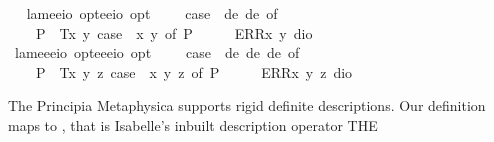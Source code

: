 \begin{isabellebody}
\isanewline
\ \isamarkupfalse%
\ lam{}{\isacharcolon}{\isacharcolon}{\isachardoublequoteopen}{\isacharparenleft}e{\isasymRightarrow}e{\isasymRightarrow}io\ opt{\isacharparenright}{\isasymRightarrow}{\isacharparenleft}e{\isasymRightarrow}e{\isasymRightarrow}io{\isacharparenright}\ opt{\isachardoublequoteclose}\ {\isacharparenleft}{\isachardoublequoteopen}\isactrlbold {\isasymlambda}\ \ {\isachardoublequoteopen}\isactrlbold {\isasymlambda}\ {\isasymequiv}\ case\ {\isacharparenleft}{\isasymPhi}\ de\ de{\isacharparenright}\ of\isanewline
\ \ \ \ P{\isacharparenleft}{\isasymphi}{\isacharparenright}\ {\isasymRightarrow}\ T{\isacharparenleft}{\isasymlambda}x\ y{\isachardot}\ case\ {\isacharparenleft}{\isasymPhi}\ x\ y{\isacharparenright}\ of\ P{\isacharparenleft}{\isasymphi}{\isacharparenright}\ {\isasymRightarrow}\ {\isasymphi}{\isacharparenright}\ {\isacharbar}\ {\isacharunderscore}\ {\isasymRightarrow}\ ERR{\isacharparenleft}{\isasymlambda}x\ y{\isachardot}\ dio{\isacharparenright}{\isachardoublequoteclose}\isanewline
\isanewline
\ \isamarkupfalse%
\ lam{}{\isacharcolon}{\isacharcolon}{\isachardoublequoteopen}{\isacharparenleft}e{\isasymRightarrow}e{\isasymRightarrow}e{\isasymRightarrow}io\ opt{\isacharparenright}{\isasymRightarrow}{\isacharparenleft}e{\isasymRightarrow}e{\isasymRightarrow}e{\isasymRightarrow}io{\isacharparenright}\ opt{\isachardoublequoteclose}\ {\isacharparenleft}{\isachardoublequoteopen}\isactrlbold {\isasymlambda}\ \ {\isachardoublequoteopen}\isactrlbold {\isasymlambda}\ {\isasymequiv}\ case\ {\isacharparenleft}{\isasymPhi}\ de\ de\ de{\isacharparenright}\ of\isanewline
\ \ \ \ P{\isacharparenleft}{\isasymphi}{\isacharparenright}\ {\isasymRightarrow}\ T{\isacharparenleft}{\isasymlambda}x\ y\ z{\isachardot}\ case\ {\isacharparenleft}{\isasymPhi}\ x\ y\ z{\isacharparenright}\ of\ P{\isacharparenleft}{\isasymphi}{\isacharparenright}\ {\isasymRightarrow}\ {\isasymphi}{\isacharparenright}\ {\isacharbar}\ {\isacharunderscore}\ {\isasymRightarrow}\ ERR{\isacharparenleft}{\isasymlambda}x\ y\ z{\isachardot}\ dio{\isacharparenright}{\isachardoublequoteclose}%
\begin{isamarkuptext}%
The Principia Metaphysica supports rigid definite descriptions. Our definition maps
   to , that is Isabelle's inbuilt description operator THE 

\end{isamarkuptext}
\end{isabellebody}
